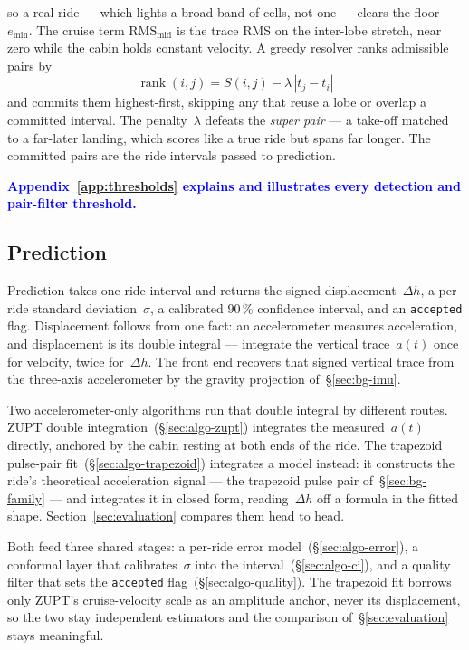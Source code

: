 \documentclass[manuscript,review,screen]{acmart}
\begin{document}
so a real ride --- which lights a broad band of cells, not one ---
clears the floor~$e_{\min}$.  The cruise term
$\mathrm{RMS}_{\mathrm{mid}}$ is the trace RMS on the inter-lobe
stretch, near zero while the cabin holds constant velocity.  A greedy
resolver ranks admissible pairs by
\begin{equation}
  \operatorname{rank}(i,j)=S(i,j)-\lambda\,|t_j-t_i|
  \label{eq:pair-rank}
\end{equation}
and commits them highest-first, skipping any that reuse a lobe or
overlap a committed interval.  The penalty~$\lambda$ defeats the
\emph{super pair} --- a take-off matched to a far-later landing,
which scores like a true ride but spans far longer.  The committed
pairs are the ride intervals passed to prediction.

\begin{center}
\textcolor{blue}{\bfseries Appendix~\ref{app:thresholds} explains and
illustrates every detection and pair-filter threshold.}
\end{center}

\subsection{Prediction}
\label{sec:algo-pred}

Prediction takes one ride interval and returns the signed
displacement~$\Delta h$, a per-ride standard deviation~$\sigma$, a
calibrated $90\,\%$ confidence interval, and an \texttt{accepted}
flag.  Displacement follows from one fact: an accelerometer measures
acceleration, and displacement is its double integral --- integrate
the vertical trace~$a(t)$ once for velocity, twice for~$\Delta h$.
The front end recovers that signed vertical trace from the three-axis
accelerometer by the gravity projection of~\S\ref{sec:bg-imu}.

Two accelerometer-only algorithms run that double integral by
different routes.  ZUPT double integration~(\S\ref{sec:algo-zupt})
integrates the measured~$a(t)$ directly, anchored by the cabin
resting at both ends of the ride.  The trapezoid pulse-pair
fit~(\S\ref{sec:algo-trapezoid}) integrates a model instead: it
constructs the ride's theoretical acceleration signal --- the
trapezoid pulse pair of~\S\ref{sec:bg-family} --- and integrates it
in closed form, reading~$\Delta h$ off a formula in the fitted shape.
Section~\ref{sec:evaluation} compares them head to head.

Both feed three shared stages: a per-ride error
model~(\S\ref{sec:algo-error}), a conformal layer that
calibrates~$\sigma$ into the interval~(\S\ref{sec:algo-ci}), and a
quality filter that sets the \texttt{accepted}
flag~(\S\ref{sec:algo-quality}).  The trapezoid fit borrows only
ZUPT's cruise-velocity scale as an amplitude anchor, never its
displacement, so the two stay independent estimators and the
comparison of~\S\ref{sec:evaluation} stays meaningful.
\end{document}
